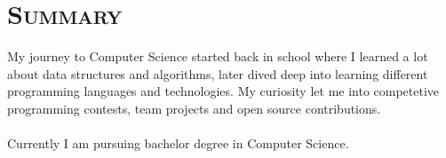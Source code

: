 \vspace*{-3em}
\section{\textsc{Summary}}


My journey to Computer Science started back in school where I learned a lot about data structures and algorithms, later dived deep into learning different programming languages
and technologies.
My curiosity let me into competetive programming contests, team projects and open source contributions. \\
\vspace{-0.2cm}\\
Currently I am pursuing bachelor degree in Computer Science.
